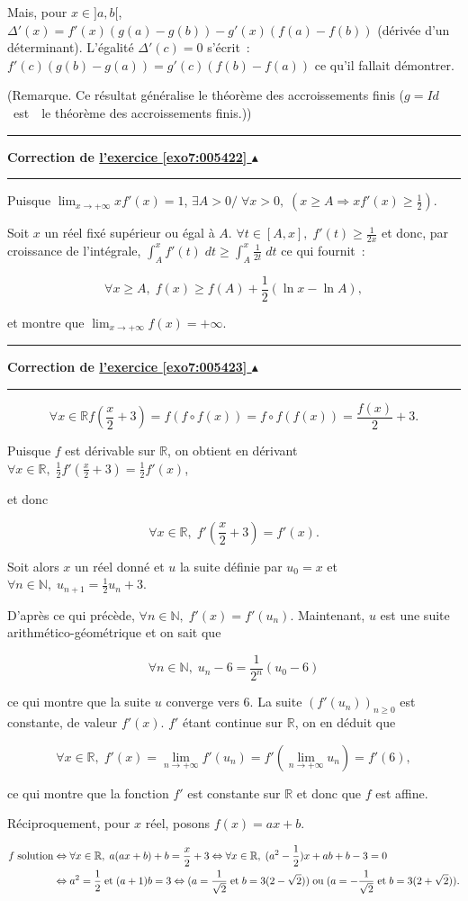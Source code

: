 \documentclass[11pt,a4paper]{article}
\newcommand{\Nn}{\mathbb{N}} \newcommand{\N}{\mathbb{N}}
\newcommand{\Rr}{\mathbb{R}} \newcommand{\R}{\mathbb{R}}
\newcounter{exo}
\newcommand{\correction}[1]{\hypertarget{cor7:#1}{}\label{cor7:#1}{\bf Correction de \hyperlink{exo7:#1}{l'exercice \ref{exo7:#1} $\blacktriangle$}}\vspace{1mm}\hrule\vspace{1mm}}
\newcommand{\fincorrection}{\vspace{1mm}\hrule\vspace*{7mm}}
\begin{document}
Mais, pour $x\in]a,b[$, $\Delta'(x)=f'(x)(g(a)-g(b))-g'(x)(f(a)-f(b))$ (dérivée d'un déterminant). L'égalité $\Delta'(c)=0$ s'écrit~: $f'(c)(g(b)-g(a))=g'(c)(f(b)-f(a))$ ce qu'il fallait démontrer.

(Remarque. Ce résultat généralise le théorème des accroissements finis ($g=Id$ \og~est~\fg~le théorème des accroissements finis.))
\fincorrection
\correction{005422}
Puisque $\lim_{x\rightarrow +\infty}xf'(x)=1$, $\exists A>0/\;\forall x>0,\;(x\geq A\Rightarrow xf'(x)\geq\frac{1}{2})$.

Soit $x$ un réel fixé supérieur ou égal à $A$. $\forall t\in[A,x],\;f'(t)\geq\frac{1}{2x}$ et donc, par croissance de l'intégrale, $\int_{A}^{x}f'(t)\;dt\geq\int_{A}^{x}\frac{1}{2t}\;dt$ ce qui fournit~:

$$\forall x\geq A,\;f(x)\geq f(A)+\frac{1}{2}(\ln x-\ln A),$$

et montre que $\lim_{x\rightarrow +\infty}f(x)=+\infty$.
\fincorrection
\correction{005423}
$$\forall x\in\Rr f(\frac{x}{2}+3)=f(f\circ f(x))=f\circ f(f(x))=\frac{f(x)}{2}+3.$$

Puisque $f$ est dérivable sur $\Rr$, on obtient en dérivant $\forall x\in\Rr,\;\frac{1}{2}f'(\frac{x}{2}+3)=\frac{1}{2}f'(x)$,

et donc

$$\forall x\in\Rr,\;f'(\frac{x}{2}+3)=f'(x).$$

Soit alors $x$ un réel donné et $u$ la suite définie par $u_0=x$ et $\forall n\in\Nn,\;u_{n+1}=\frac{1}{2}u_n+3$.

D'après ce qui précède, $\forall n\in\Nn,\;f'(x)=f'(u_n)$.
Maintenant, $u$ est une suite arithmético-géométrique et on sait que 

$$\forall n\in\Nn,\;u_n-6=\frac{1}{2^n}(u_0-6)$$ 

ce qui montre que la suite $u$ converge vers $6$. La suite $(f'(u_n))_{n\geq0}$ est constante, de valeur $f'(x)$. $f'$ étant continue sur $\Rr$, on en déduit que

$$\forall x\in\Rr,\;f'(x)=\lim_{n\rightarrow +\infty}f'(u_n)=f'(\lim_{n\rightarrow +\infty}u_n)=f'(6),$$

ce qui montre que la fonction $f'$ est constante sur $\Rr$ et donc que $f$ est affine.

Réciproquement, pour $x$ réel, posons $f(x)=ax+b$.
 
\begin{align*}\ensuremath
f\;\mbox{solution}&\Leftrightarrow\forall x\in\Rr,\;a(ax+b)+b=\frac{x}{2}+3\Leftrightarrow\forall x\in\Rr,\;(a^2-\frac{1}{2})x+ab+b-3=0\\
 &\Leftrightarrow a^2=\frac{1}{2}\;\mbox{et}\;(a+1)b=3\Leftrightarrow(a=\frac{1}{\sqrt{2}}\;\mbox{et}\;b=3(2-\sqrt{2}))\;\mbox{ou}\;(a=-\frac{1}{\sqrt{2}}\;\mbox{et}\;b=3(2+\sqrt{2})).
\end{align*}
\end{document}
